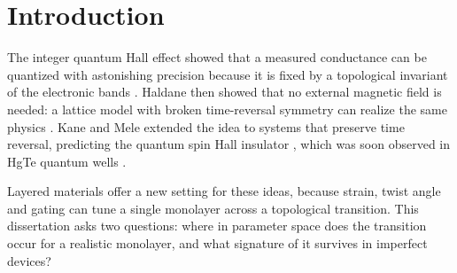 \chapter{Introduction}
\label{ch:introduction}

The integer quantum Hall effect showed that a measured conductance can be quantized with
astonishing precision because it is fixed by a topological invariant of the electronic
bands \citep{thouless1982}. Haldane then showed that no external magnetic field is needed:
a lattice model with broken time-reversal symmetry can realize the same physics
\citep{haldane1988}. Kane and Mele extended the idea to systems that preserve time reversal,
predicting the quantum spin Hall insulator \citep{kane2005}, which was soon observed in HgTe
quantum wells \citep{bernevig2006}.

Layered materials offer a new setting for these ideas, because strain, twist angle and gating
can tune a single monolayer across a topological transition. This dissertation asks two
questions: where in parameter space does the transition occur for a realistic monolayer, and
what signature of it survives in imperfect devices?
